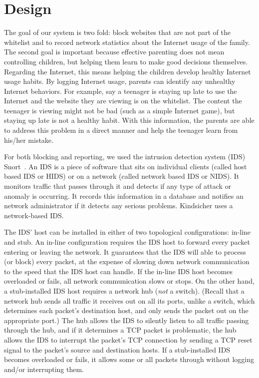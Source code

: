
\section{Design}

The goal of our system is two fold: block websites that are not part of the
whitelist and to record network statistics about the Internet usage of the
family.
%
The second goal is important because effective parenting does not mean
controlling children, but helping them learn to make good decisions
themselves.\cite{severe}
%
Regarding the Internet, this means helping the children develop healthy
Internet usage habits.
%
By logging Internet usage, parents can identify any unhealthy Internet
behaviors.
%
For example, say a teenager is staying up late to use the Internet and the
website they are viewing is on the whitelist.
%
The content the teenager is viewing might not be bad (such as a simple
Internet game), but staying up late is not a healthy habit.
%
With this information, the parents are able to address this problem in a
direct manner and help the teenager learn from his/her mistake.

For both blocking and reporting, we used the intrusion detection system (IDS)
Snort~\cite{snort}. An IDS is a piece of software that sits on individual
clients (called host based IDS or HIDS) or on a network (called network based
IDS or NIDS). It monitors traffic that passes through it and detects if any
type of attack or anomaly is occurring. It records this information in a
database and notifies an network administrator if it detects any serious
problems.  Kindsicher uses a network-based IDS.

The IDS' host can be installed in either of two topological configurations:
in-line and stub.
%
An in-line configuration requires the IDS host to forward every packet
entering or leaving the network.
%
It guarantees that the IDS will able to process (or block) every packet, at
the expense of slowing down network communication to the speed that the IDS
host can handle.
%
If the in-line IDS host becomes overloaded or fails, all network communication
slows or stops.
%
On the other hand, a stub-installed IDS host requires a network hub (\emph{not} a
switch).
%
(Recall that a network hub sends all traffic it receives out on all its ports,
unlike a switch, which determines each packet's destination host, and only
sends the packet out on the appropriate port.)
%
The hub allows the IDS to silently listen to all traffic passing through the
hub, and if it determines a TCP packet is problematic, the hub allows the IDS
to interrupt the packet's TCP connection by sending a TCP reset signal to the
packet's source and destination hosts.
%
If a stub-installed IDS becomes overloaded or fails, it allows some or all
packets through without logging and/or interrupting them.

